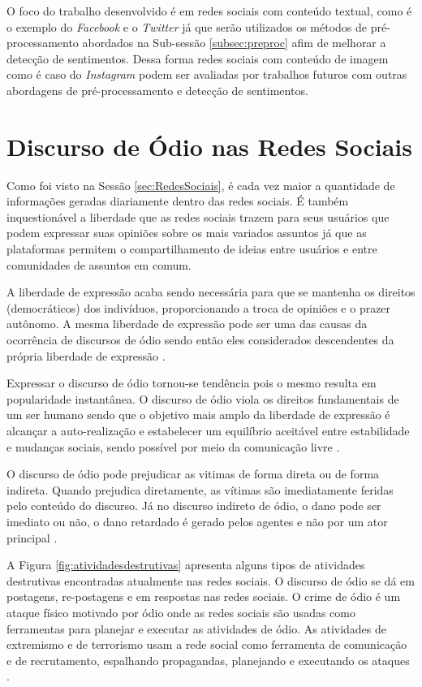 O foco do trabalho desenvolvido é em redes sociais com conteúdo textual, como é o exemplo do \textit{Facebook} e o \textit{Twitter} já que serão utilizados os métodos de pré-processamento abordados na Sub-sessão \ref{subsec:preproc} afim de melhorar a detecção de sentimentos. Dessa forma redes sociais com conteúdo de imagem como é caso do \textit{Instagram} podem ser avaliadas por trabalhos futuros com outras abordagens de pré-processamento e detecção de sentimentos.

\section{Discurso de Ódio nas Redes Sociais}
Como foi visto na Sessão \ref{sec:RedesSociais}, é cada vez maior a quantidade de informações geradas diariamente dentro das redes sociais. É também inquestionável a liberdade que as redes sociais trazem para seus usuários que podem expressar suas opiniões sobre os mais variados assuntos já que as plataformas permitem o compartilhamento de ideias entre usuários e entre comunidades de assuntos em comum. 

A liberdade de expressão acaba sendo necessária para que se mantenha os direitos (democráticos) dos indivíduos, proporcionando a troca de opiniões e o prazer autônomo. A mesma liberdade de expressão pode ser uma das causas da ocorrência de discursos de ódio sendo então eles  considerados descendentes da própria liberdade de expressão \cite{Chetty2018}.

Expressar o discurso de ódio tornou-se tendência pois o mesmo resulta em popularidade instantânea. O discurso de ódio viola os direitos fundamentais de um ser humano sendo que o objetivo mais amplo da liberdade de expressão é alcançar a auto-realização e estabelecer um equilíbrio aceitável entre estabilidade e mudanças sociais, sendo possível por meio da comunicação livre \cite{Chetty2018}.

O discurso de ódio pode prejudicar as vitimas de forma direta ou de forma indireta. Quando prejudica diretamente, as vítimas são imediatamente feridas pelo conteúdo do discurso. Já no discurso indireto de ódio, o dano pode ser imediato ou não, o dano retardado é gerado pelos agentes e não por um ator principal \cite{Seglow2016}. 

A Figura \ref{fig:atividadesdestrutivas} apresenta alguns tipos de atividades destrutivas encontradas atualmente nas redes sociais. O discurso de ódio se dá em postagens, re-postagens e em respostas nas redes sociais. O crime de ódio é um ataque físico motivado por ódio onde as redes sociais são usadas como ferramentas para planejar e executar as atividades de ódio. As atividades de extremismo e de terrorismo usam a rede social como ferramenta de comunicação e de recrutamento, espalhando propagandas, planejando e executando os ataques  \cite{Chetty2018}.

